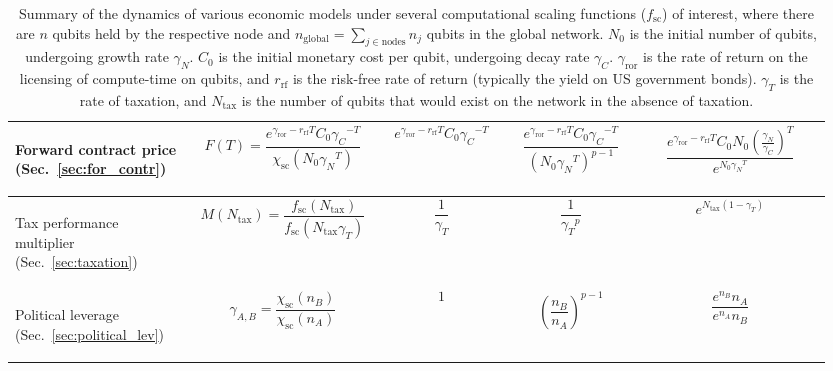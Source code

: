 \begin{table}[!htbp]
{\begin{tabular}{|m{0.21\linewidth}|m{0.21\linewidth}|m{0.15\linewidth}|m{0.155\linewidth}|m{0.225\linewidth}|}
	\hline
	\begin{flushleft}Forward contract price (Sec.~\ref{sec:for_contr})\end{flushleft} & \[F(T)=\frac{e^{\gamma_\mathrm{ror}-r_\mathrm{rf}T} C_0{\gamma_C}^{-T}}{\chi_\mathrm{sc}(N_0 {\gamma_N}^T)}\]
 & \[e^{\gamma_\mathrm{ror}-r_\mathrm{rf}T} C_0{\gamma_C}^{-T}\] & \[\frac{e^{\gamma_\mathrm{ror}-r_\mathrm{rf}T} C_0{\gamma_C}^{-T}}{(N_0 {\gamma_N}^T)^{p-1}}\] & \[\frac{e^{\gamma_\mathrm{ror}-r_\mathrm{rf}T} C_0N_0\left(\frac{\gamma_N}{\gamma_C}\right)^T}{e^{N_0 {\gamma_N}^T}}\] \\
	\hline
	\begin{flushleft}Tax performance multiplier (Sec.~\ref{sec:taxation})\end{flushleft} & \[M(N_\mathrm{tax})=\frac{f_\mathrm{sc}(N_\mathrm{tax})}{f_\mathrm{sc}(N_\mathrm{tax} \gamma_T)}\] & \[\frac{1}{\gamma_T}\] & \[\frac{1}{{\gamma_T}^p}\] & \[e^{N_\mathrm{tax}(1-\gamma_T)}\]\\
	\hline
	\begin{flushleft}Political leverage (Sec.~\ref{sec:political_lev})\end{flushleft} & \[\gamma_{A,B}=\frac{\chi_\mathrm{sc}(n_B)}{\chi_\mathrm{sc}(n_A)}\] & \[1\] & \[\left(\frac{n_B}{n_A}\right)^{p-1}\] & \[\frac{e^{n_B}n_A}{e^{n_A}n_B}\] \\
	\hline
	\end{tabular}}
\captionspacetab \caption{Summary of the dynamics of various economic models under several computational scaling functions ($f_\mathrm{sc}$) of interest, where there are $n$ qubits held by the respective node and \mbox{$n_\mathrm{global}=\sum_{j\in \mathrm{nodes}} n_j$} qubits in the global network. $N_0$ is the initial number of qubits, undergoing growth rate $\gamma_N$. $C_0$ is the initial monetary cost per qubit, undergoing decay rate $\gamma_C$. $\gamma_\mathrm{ror}$ is the rate of return on the licensing of compute-time on qubits, and $r_\mathrm{rf}$ is the risk-free rate of return (typically the yield on US government bonds). $\gamma_T$ is the rate of taxation, and $N_\mathrm{tax}$ is the number of qubits that would exist on the network in the absence of taxation.} \label{tab:summary_ec_models}
\end{table}

\renewcommand{\arraystretch}{1}
\startalgtable

\clearpage